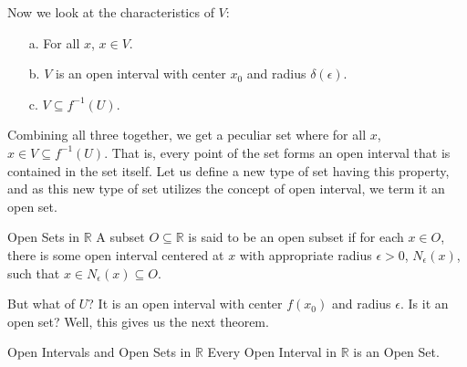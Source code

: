 Now we look at the characteristics of $V$:
\begin{enumerate}
    \item[a.] For all $x$, $x\in V$.
    \item[b.] $V$ is an open interval with center $x_0$ and radius $\delta(\epsilon)$.
    \item[c.] $V\subseteq f^{-1}(U)$.
\end{enumerate}
Combining all three together, we get a peculiar set where for all $x$, $x\in V\subseteq f^{-1}(U)$. That is, every point of the set forms an open interval that is contained in the set itself. Let us define a new type of set having this property, and as this new type of set utilizes the concept of open interval, we term it an open set.
\begin{Definition}{Open Sets in \(\mathbb{R}\)}
    A subset $O\subseteq\mathbb{R}$ is said to be an open subset if for each $x\in O$, there is some open interval centered at $x$ with appropriate radius $\epsilon>0$, $N_{\epsilon}(x)$, such that $x\in N_{\epsilon}(x)\subseteq O$.
\end{Definition}
\noindent But what of $U$? It is an open interval with center $f(x_0)$ and radius $\epsilon$. Is it an open set? Well, this gives us the next theorem.
\begin{Theorem}{Open Intervals and Open Sets in \(\mathbb{R}\)}\label{open_interval_open_sets}
    Every Open Interval in $\mathbb{R}$ is an Open Set.
\end{Theorem}

